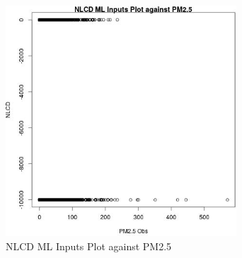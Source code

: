 \begin{figure} 
\centering  
\includegraphics[width=0.77\textwidth]{Code_Outputs/ML_input_report_ML_input_PM25_Step5_part_d_de_duplicated_aves_ML_input_NLCDvPM25_Obs.jpg} 
\caption{\label{fig:ML_input_report_ML_input_PM25_Step5_part_d_de_duplicated_aves_ML_inputNLCDvPM25_Obs}NLCD ML Inputs Plot against PM2.5} 
\end{figure} 
 
